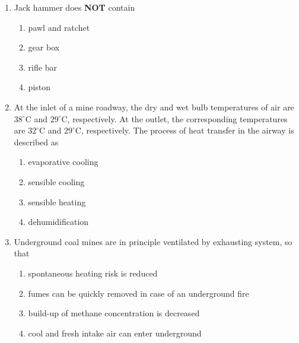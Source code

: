 \documentclass[journal]{IEEEtran}
\begin{document}
\begin{enumerate}
\item Jack hammer does \textbf{NOT} contain
  \begin{enumerate}
\item pawl and ratchet
      \item gear box
      \item rifle bar
      \item piston
  \end{enumerate}
  \hfill{}
\item At the inlet of a mine roadway, the dry and wet bulb temperatures of air are $38^{\circ}\mathrm{C}$ and $29^{\circ}\mathrm{C}$, respectively. At the outlet, the corresponding temperatures are $32^{\circ}\mathrm{C}$ and $29^{\circ}\mathrm{C}$, respectively. The process of heat transfer in the airway is described as
  \begin{enumerate}
\item evaporative cooling
      \item sensible cooling
      \item sensible heating
      \item dehumidification
  \end{enumerate}
  \hfill{}
\item Underground coal mines are in principle ventilated by exhausting system, so that
  \begin{enumerate}
\item spontaneous heating risk is reduced
      \item fumes can be quickly removed in case of an underground fire
      \item build-up of methane concentration is decreased
      \item cool and fresh intake air can enter underground
  \end{enumerate}
  \hfill{}


\end{enumerate}
\end{document}
